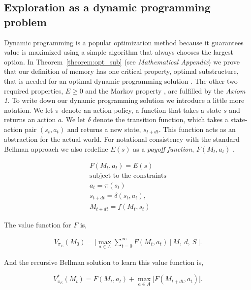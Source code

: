 \documentclass[9pt,twocolumn,twoside]{pnas-new}
\begin{document}
\subsection*{Exploration as a dynamic programming problem} Dynamic programming is a popular optimization method because it guarantees value is maximized using a simple algorithm that always chooses the largest option. In Theorem~\ref{theorem:opt_sub} (see \textit{Mathematical Appendix}) we prove that our definition of memory has one critical property, optimal substructure, that is needed for an optimal dynamic programming solution \cite{Bellmann1954,Roughgarden2019}. The other two required properties, $E \ge 0$ and the Markov property \cite{Bellmann1954,Roughgarden2019}, are fulfilled by the \textit{Axiom 1}. 
To write down our dynamic programming solution we introduce a little more notation. We let $\pi$ denote an action policy, a function that takes a state $s$ and returns an action $a$. We let $\delta$ denote the transition function, which takes a state-action pair $(s_{t},a_t)$ and returns a new state, $s_{t+dt}$. This function acts as an abstraction for the actual world. For notational consistency with the standard Bellman approach we also redefine $E(s)$ as a \textit{payoff function}, $F(M_{t}, a_t)$ \cite{Bellmann1954}.
 
\begin{equation}
	\begin{split}\label{eq:payout} 
		F(M_{t}, a_t) = E(s)\\
		\text{subject to the constraints} \\
		a_{t} = \pi(s_t) \\
		s_{t+dt} = \delta(s_{t}, a_t),\\
		M_{t+dt} = f(M_{t}, s_{t}) 
	\end{split}
\end{equation}

\noindent The value function for $F$ is,

\begin{equation}\label{eq:V_E} 
	\begin{split}
		V_{\pi_E}(M_0) = \Big [ \max_{a \in A} \sum_{t=0}^{\infty} F(M_t, a_t) \ \Big | \ M, \ d, \ S \ \Big ]. 
	\end{split}
\end{equation}

\noindent And the recursive Bellman solution to learn this value function is,

\begin{equation}\label{eq:bellman_iter} 
	V^*_{\pi_E}(M_{t}) = F(M_{t}, a_{t}) + \max_{a \in A} \Big [ F(M_{t+dt}, a_t) \Big ].
\end{equation}
\end{document}
